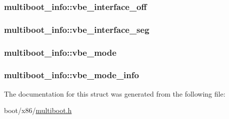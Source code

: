 \subsubsection[{vbe\+\_\+interface\+\_\+off}]{ multiboot\+\_\+info\+::vbe\+\_\+interface\+\_\+off}\label{structmultiboot__info_a1621d51b1cc198a1496e9f61b3708291}
\hypertarget{structmultiboot__info_a204c99787efd58c0f54fe1e056b1d69f}{}
\subsubsection[{vbe\+\_\+interface\+\_\+seg}]{ multiboot\+\_\+info\+::vbe\+\_\+interface\+\_\+seg}\label{structmultiboot__info_a204c99787efd58c0f54fe1e056b1d69f}
\hypertarget{structmultiboot__info_ac7653182e52bddb7e437cc8a66d74ce5}{}
\subsubsection[{vbe\+\_\+mode}]{ multiboot\+\_\+info\+::vbe\+\_\+mode}\label{structmultiboot__info_ac7653182e52bddb7e437cc8a66d74ce5}
\hypertarget{structmultiboot__info_a88f574fe1adbcb5ff63fc95b2e072b4c}{}
\subsubsection[{vbe\+\_\+mode\+\_\+info}]{ multiboot\+\_\+info\+::vbe\+\_\+mode\+\_\+info}\label{structmultiboot__info_a88f574fe1adbcb5ff63fc95b2e072b4c}


The documentation for this struct was generated from the following file\+:\begin{DoxyCompactItemize}
\item 
boot/x86/\hyperlink{multiboot_8h}{multiboot.\+h}\end{DoxyCompactItemize}

